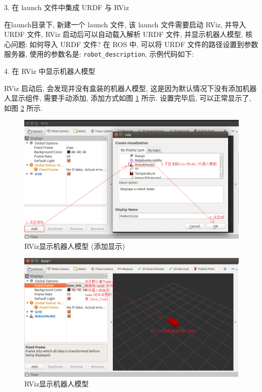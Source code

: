 \documentclass[openany, fontset=windowsold]{ctexbook}
\theoremstyle{kaiti}
\theoremstyle{normal}
\begin{document}
3. 在 launch 文件中集成 URDF 与 RViz

在launch目录下, 新建一个 launch 文件, 该 launch 文件需要启动 RViz, 并导入 URDF 文件, RViz 启动后可以自动载入解析 URDF 文件, 并显示机器人模型, 核心问题: 如何导入 URDF 文件? 在 ROS 中, 可以将 URDF 文件的路径设置到参数服务器, 使用的参数名是: \verb|robot_description|, 示例代码如下:


4. 在 RViz 中显示机器人模型

RViz 启动后, 会发现并没有盒装的机器人模型, 这是因为默认情况下没有添加机器人显示组件, 需要手动添加, 添加方式如图 \ref{fig:ros_sim_urdf_rviz_setting_01} 所示. 设置完毕后, 可以正常显示了, 如图 \ref{fig:ros_sim_urdf_rviz_setting_02} 所示.

\begin{figure}[!ht]
  \centering
  \includegraphics[width=.9\textwidth]{ros_sim_urdf_rviz_setting_01.png}
  \caption{RViz显示机器人模型 (添加显示)}
  \label{fig:ros_sim_urdf_rviz_setting_01}
\end{figure}

\begin{figure}[!ht]
  \centering
  \includegraphics[width=.9\textwidth]{ros_sim_urdf_rviz_setting_02.png}
  \caption{RViz显示机器人模型}
  \label{fig:ros_sim_urdf_rviz_setting_02}
\end{figure}
\end{document}
